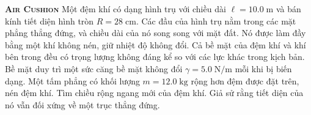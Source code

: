 	

\begin{problem}{\textbf{\textsc{Air Cushion}}}
Một đệm khí có dạng hình trụ với chiều dài $\ell=10.0\;\mathrm{m}$ và bán kính tiết diện hình tròn $R=28\;\mathrm{cm}$. Các đầu của hình trụ nằm trong các mặt phẳng thẳng đứng, và chiều dài của nó song song với mặt đất. Nó được làm đầy bằng một khí không nén, giữ nhiệt độ không đổi. Cả bề mặt của đệm khí và khí bên trong đều có trọng lượng không đáng kể so với các lực khác trong kịch bản. Bề mặt duy trì một sức căng bề mặt không đổi $\gamma=5.0\;\mathrm{N/m}$ mỗi khi bị biến dạng. Một tấm phẳng có khối lượng $m=12.0\;\mathrm{kg}$ rộng hơn đệm được đặt trên, nén đệm khí. Tìm chiều rộng ngang mới của đệm khí. Giả sử rằng tiết diện của nó vẫn đối xứng về một trục thẳng đứng.   
\end{problem}